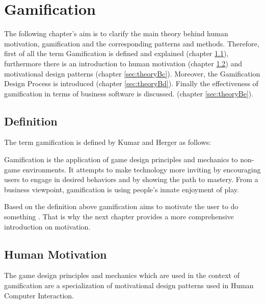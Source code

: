 \newpage
\section{Gamification}
\label{sec:theoryB}

The following chapter's aim is to clarify the main theory behind human motivation, gamification and the corresponding patterns and methods. Therefore, first of all the term Gamification is defined and explained (chapter \ref{sec:theoryBa}), furthermore there is an introduction to human motivation (chapter \ref{sec:theoryBb}) and motivational design patterns (chapter \ref{sec:theoryBc}). Moreover, the Gamification Design Process is introduced (chapter \ref{sec:theoryBd}). Finally the effectiveness of gamification in terms of business software is discussed. (chapter \ref{sec:theoryBe}).


\subsection{Definition}
\label{sec:theoryBa}

The term gamification is defined by Kumar and Herger as follows:

\begin{fquote}
	Gamification is the application of game design principles and mechanics to
	non-game environments. It attempts to make technology more inviting by encouraging users to engage in desired behaviors and by showing the path to mastery.
	From a business viewpoint, gamification is using people’s innate enjoyment of play.
\end{fquote}

Based on the definition above gamification aims to motivate the user to do something \cite[p. 8]{kumarGamificationWorkDesigning2013}. That is why the next chapter provides a more comprehensive introduction on motivation. 


\subsection{Human Motivation}
\label{sec:theoryBb}

The game design principles and mechanics which are used in the context of gamification are a specialization of motivational design patterns used in Human Computer Interaction. \cite[p. 59]{kumarGamificationWorkDesigning2013}

